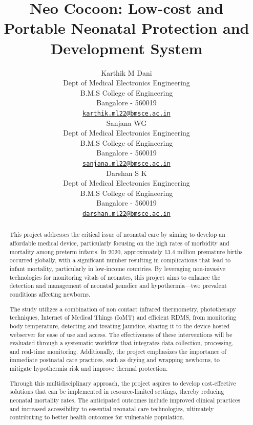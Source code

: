 \documentclass{article}
\title{Neo Cocoon: Low-cost and Portable Neonatal Protection and
Development System}
\author{
    Karthik M Dani
   \\
    Dept of Medical Electronics Engineering \\
    B.M.S College of Engineering \\
  Bangalore - 560019 \\
  \texttt{\href{mailto:karthik.ml22@bmsce.ac.in}{\nolinkurl{karthik.ml22@bmsce.ac.in}}} \\
   \And
    Sanjana WG
   \\
    Dept of Medical Electronics Engineering \\
    B.M.S College of Engineering \\
  Bangalore - 560019 \\
  \texttt{\href{mailto:sanjana.ml22@bmsce.ac.in}{\nolinkurl{sanjana.ml22@bmsce.ac.in}}} \\
   \And
    Darshan S K
   \\
    Dept of Medical Electronics Engineering \\
    B.M.S College of Engineering \\
  Bangalore - 560019 \\
  \texttt{\href{mailto:darshan.ml22@bmsce.ac.in}{\nolinkurl{darshan.ml22@bmsce.ac.in}}} \\
  }
\begin{document}
\maketitle


\begin{abstract}
This project addresses the critical issue of neonatal care by aiming to
develop an affordable medical device, particularly focusing on the high
rates of morbidity and mortality among preterm infants. In 2020,
approximately 13.4 million premature births occurred globally, with a
significant number resulting in complications that lead to infant
mortality, particularly in low-income countries. By leveraging
non-invasive technologies for monitoring vitals of neonates, this
project aims to enhance the detection and management of neonatal
jaundice and hypothermia---two prevalent conditions affecting newborns.

The study utilizes a combination of non contact infrared thermometry,
phototherapy techniques, Internet of Medical Things (IoMT) and efficient
RDMS, from monitoring body temperature, detecting and treating jaundice,
sharing it to the device hosted webserver for ease of use and access.
The effectiveness of these interventions will be evaluated through a
systematic workflow that integrates data collection, processing, and
real-time monitoring. Additionally, the project emphasizes the
importance of immediate postnatal care practices, such as drying and
wrapping newborns, to mitigate hypothermia risk and improve thermal
protection.

Through this multidisciplinary approach, the project aspires to develop
cost-effective solutions that can be implemented in resource-limited
settings, thereby reducing neonatal mortality rates. The anticipated
outcomes include improved clinical practices and increased accessibility
to essential neonatal care technologies, ultimately contributing to
better health outcomes for vulnerable population.
\end{abstract}

\end{document}
